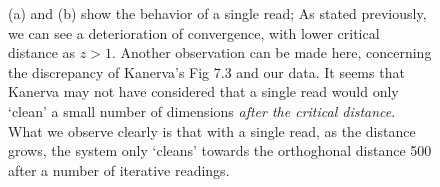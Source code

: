 \begin{figure}[h!]
  \centering


  \caption{(a) and (b) show the behavior of a single read; As stated previously, we can see a deterioration of convergence, with lower critical distance as $z>1$.  Another observation can be made here, concerning the discrepancy of Kanerva's Fig 7.3 and our data.  It seems that Kanerva may not have considered that a single read would only `clean' a small number of dimensions \emph{after the critical distance}. What we observe clearly is that with a single read, as the distance grows, the system only `cleans' towards the orthoghonal distance 500 after a number of iterative readings.}
  \label{fig:murillo-generalization-experiments}
\end{figure}

